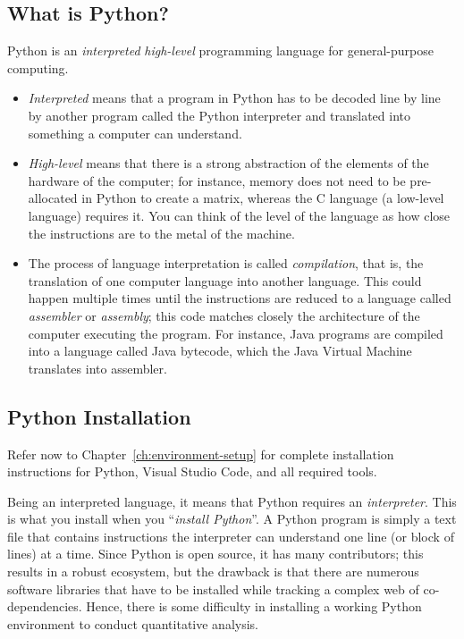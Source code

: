 \subsection{What is Python?}

Python is an \textit{interpreted} \textit{high-level} programming language for general-purpose computing. 

\begin{itemize}
	\item{} \textit{Interpreted} means that a program in Python has to be decoded line by line by another program called the Python interpreter and translated into something a computer can understand. 
	\item{} \textit{High-level} means that there is a strong abstraction of the elements of the hardware of the computer; for instance, memory does not need to be pre-allocated in Python to create a matrix, whereas the C language (a low-level language) requires it. You can think of the level of the language as how close the instructions are to the metal of the machine. 
	\item{} The process of language interpretation is called \textit{compilation}, that is, the translation of one computer language into another language. This could happen multiple times until the instructions are reduced to a language called \textit{assembler} or \textit{assembly}; this code matches closely the architecture of the computer executing the program. For instance, Java programs are compiled into a language called Java bytecode, which the Java Virtual Machine translates into assembler. 
\end{itemize}


\subsection{Python Installation}

Refer now to Chapter~\ref{ch:environment-setup} for complete installation
instructions for Python, Visual Studio Code, and all required tools.

Being an interpreted language, it means that Python requires an \textit{interpreter}. This is what you install when you ``\textit{install Python}''. A Python program is simply a text file that contains instructions the interpreter can understand one line (or block of lines) at a time. Since Python is open source, it has many contributors; this results in a robust ecosystem, but the drawback is that there are numerous software libraries that have to be installed while tracking a complex web of co-dependencies. Hence, there is some difficulty in installing a working Python environment to conduct quantitative analysis. 

